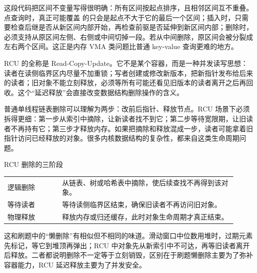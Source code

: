 这段代码把区间不变量写得很明确：所有区间按起点排序，且相邻区间互不重叠。点查询时，真正可能覆盖  的只会是起点不大于它的最后一个区间；插入时，只需要检查后继是否从新区间内部开始，再检查前驱是否延伸到新区间内部；删除时，必须支持从原区间左侧、右侧或中间切掉一段。若从中间删除，原区间会被分裂成左右两个区间。这正是内存 VMA 类问题比普通 key-value 查询更难的地方。


RCU 的全称是 Read-Copy-Update。它不是某个容器，而是一种并发读写思想：读者在读侧临界区内尽量不加重锁；写者创建或修改新版本，把新指针发布给后来的读者；旧对象不能立刻释放，必须等所有可能还看见旧版本的读者离开之后再回收。这个“延迟释放”会直接改变数据结构删除操作的含义。

普通单线程链表删除可以理解为两步：改前后指针、释放节点。RCU 场景下必须拆得更细：第一步从索引中摘除，让新读者找不到它；第二步等待宽限期，让旧读者不再持有它；第三步才释放内存。如果把摘除和释放混成一步，读者可能拿着旧指针访问已经释放的对象。很多内核数据结构的复杂性，都来自这类生命周期问题。

\begin{principlebox}{RCU 删除的三阶段}
\begin{tabular}{@{}p{0.22\linewidth}p{0.7\linewidth}@{}}
逻辑删除 & 从链表、树或哈希表中摘除，使后续查找不再得到该对象。\\
等待读者 & 等待读侧临界区结束，确保旧读者不再访问旧对象。\\
物理释放 & 释放内存或归还缓存，此时对象生命周期才真正结束。\\
\end{tabular}
\end{principlebox}

这和刷题中的“懒删除”有相似但不相同的味道。滑动窗口中位数用堆时，过期元素先标记，等它到堆顶再弹出；RCU 中对象先从新索引中不可达，再等旧读者离开后释放。二者都说明删除不一定等于立刻销毁，区别在于刷题懒删除主要为了弥补容器能力，RCU 延迟释放主要为了并发安全。

